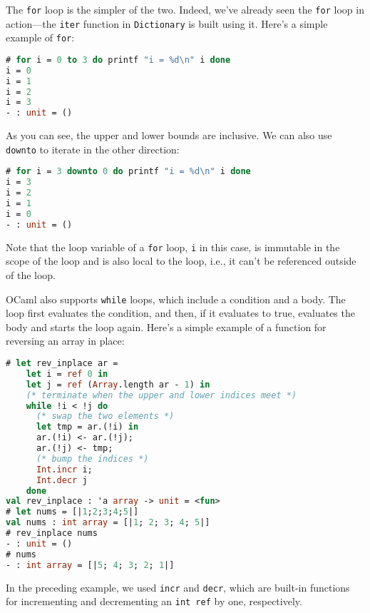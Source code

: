 The \passthrough{\lstinline!for!} loop is the simpler of the two.
Indeed, we've already seen the \passthrough{\lstinline!for!} loop in
action---the \passthrough{\lstinline!iter!} function in
\passthrough{\lstinline!Dictionary!} is built using it. Here's a simple
example of \passthrough{\lstinline!for!}:

\begin{lstlisting}[language=Caml]
# for i = 0 to 3 do printf "i = %d\n" i done
i = 0
i = 1
i = 2
i = 3
- : unit = ()
\end{lstlisting}

As you can see, the upper and lower bounds are inclusive. We can also
use \passthrough{\lstinline!downto!} to iterate in the other direction:

\begin{lstlisting}[language=Caml]
# for i = 3 downto 0 do printf "i = %d\n" i done
i = 3
i = 2
i = 1
i = 0
- : unit = ()
\end{lstlisting}

Note that the loop variable of a \passthrough{\lstinline!for!} loop,
\passthrough{\lstinline!i!} in this case, is immutable in the scope of
the loop and is also local to the loop, i.e., it can't be referenced
outside of the loop.

OCaml also supports \passthrough{\lstinline!while!} loops, which include
a condition and a body. The loop first evaluates the condition, and
then, if it evaluates to true, evaluates the body and starts the loop
again. Here's a simple example of a function for reversing an array in
place:

\begin{lstlisting}[language=Caml]
# let rev_inplace ar =
    let i = ref 0 in
    let j = ref (Array.length ar - 1) in
    (* terminate when the upper and lower indices meet *)
    while !i < !j do
      (* swap the two elements *)
      let tmp = ar.(!i) in
      ar.(!i) <- ar.(!j);
      ar.(!j) <- tmp;
      (* bump the indices *)
      Int.incr i;
      Int.decr j
    done
val rev_inplace : 'a array -> unit = <fun>
# let nums = [|1;2;3;4;5|]
val nums : int array = [|1; 2; 3; 4; 5|]
# rev_inplace nums
- : unit = ()
# nums
- : int array = [|5; 4; 3; 2; 1|]
\end{lstlisting}

In the preceding example, we used \passthrough{\lstinline!incr!} and
\passthrough{\lstinline!decr!}, which are built-in functions for
incrementing and decrementing an \passthrough{\lstinline!int ref!} by
one, respectively.

